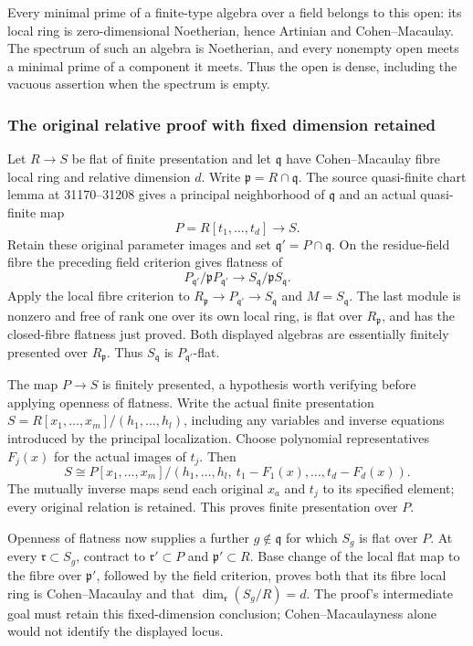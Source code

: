 Every minimal prime of a finite-type algebra over a field belongs to this open: its local ring is zero-dimensional Noetherian, hence Artinian and Cohen--Macaulay. The spectrum of such an algebra is Noetherian, and every nonempty open meets a minimal prime of a component it meets. Thus the open is dense, including the vacuous assertion when the spectrum is empty.

\subsubsection{The original relative proof with fixed dimension retained}\label{the-original-relative-proof-with-fixed-dimension-retained}

Let \(R\to S\) be flat of finite presentation and let \(\mathfrak q\) have Cohen--Macaulay fibre local ring and relative dimension \(d\). Write \(\mathfrak p=R\cap\mathfrak q\). The source quasi-finite chart lemma at 31170--31208 gives a principal neighborhood of \(\mathfrak q\) and an actual quasi-finite map \[
P=R[t_1,\ldots,t_d]\longrightarrow S.
\] Retain these original parameter images and set \(\mathfrak q'=P\cap\mathfrak q\). On the residue-field fibre the preceding field criterion gives flatness of \[
P_{\mathfrak q'}/\mathfrak pP_{\mathfrak q'}
\longrightarrow S_{\mathfrak q}/\mathfrak pS_{\mathfrak q}.
\] Apply the local fibre criterion to \(R_{\mathfrak p}\to P_{\mathfrak q'}\to S_{\mathfrak q}\) and \(M=S_{\mathfrak q}\). The last module is nonzero and free of rank one over its own local ring, is flat over \(R_{\mathfrak p}\), and has the closed-fibre flatness just proved. Both displayed algebras are essentially finitely presented over \(R_{\mathfrak p}\). Thus \(S_{\mathfrak q}\) is \(P_{\mathfrak q'}\)-flat.

The map \(P\to S\) is finitely presented, a hypothesis worth verifying before applying openness of flatness. Write the actual finite presentation \(S=R[x_1,\ldots,x_m]/(h_1,\ldots,h_l)\), including any variables and inverse equations introduced by the principal localization. Choose polynomial representatives \(F_j(x)\) for the actual images of \(t_j\). Then \[
S\cong
P[x_1,\ldots,x_m]/
(h_1,\ldots,h_l,\ t_1-F_1(x),\ldots,t_d-F_d(x)).
\] The mutually inverse maps send each original \(x_a\) and \(t_j\) to its specified element; every original relation is retained. This proves finite presentation over \(P\).

Openness of flatness now supplies a further \(g\notin\mathfrak q\) for which \(S_g\) is flat over \(P\). At every \(\mathfrak r\subset S_g\), contract to \(\mathfrak r'\subset P\) and \(\mathfrak p'\subset R\). Base change of the local flat map to the fibre over \(\mathfrak p'\), followed by the field criterion, proves both that its fibre local ring is Cohen--Macaulay and that \(\dim_{\mathfrak r}(S_g/R)=d\). The proof's intermediate goal must retain this fixed-dimension conclusion; Cohen--Macaulayness alone would not identify the displayed locus.

